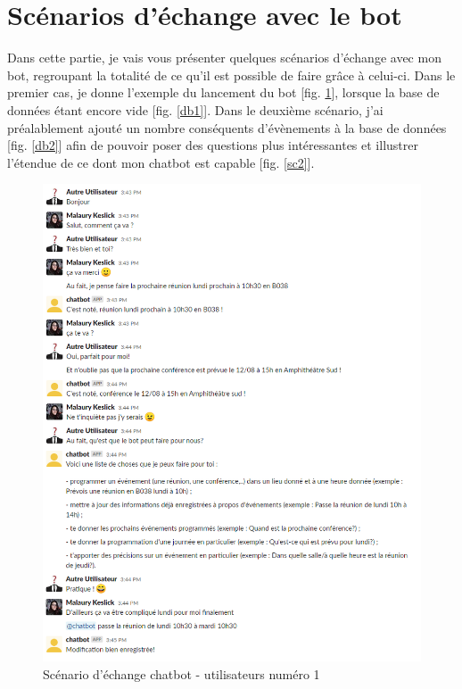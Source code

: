 \documentclass[stage2a]{tnreport} %
\begin{document}
\section{Scénarios d'échange avec le bot}
Dans cette partie, je vais vous présenter quelques scénarios d'échange avec mon bot, regroupant la totalité de ce qu'il est possible de faire grâce à celui-ci. Dans le premier cas, je donne l'exemple du lancement du bot [fig. \ref{sc1}], lorsque la base de données étant encore vide [fig. \ref{db1}]. Dans le deuxième scénario, j'ai préalablement ajouté un nombre conséquents d'évènements à la base de données [fig. \ref{db2}] afin de pouvoir poser des questions plus intéressantes et illustrer l'étendue de ce dont mon chatbot est capable [fig. \ref{sc2}].\\
\begin{figure}[H]
    \centering
    \includegraphics[width=\textwidth]{figures/scenario1.png}
    \caption{Scénario d'échange chatbot - utilisateurs numéro 1}
    \label{sc1}
\end{figure}
\end{document}
